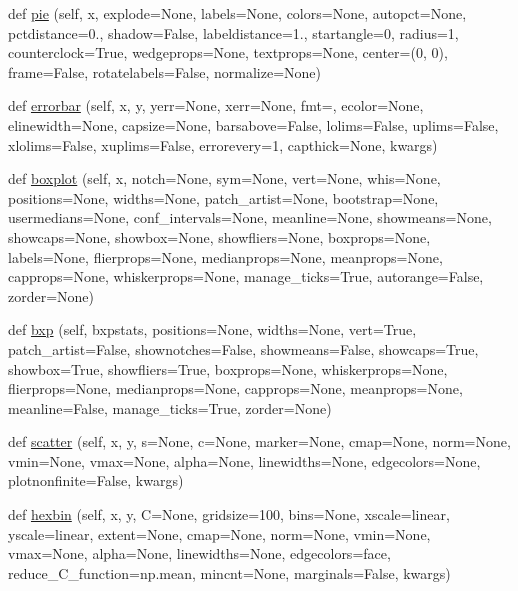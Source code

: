 \begin{DoxyCompactItemize}
\item 
def \hyperlink{classmatplotlib_1_1axes_1_1__axes_1_1Axes_ae60208a653a0074355baac9751f6a617}{pie} (self, x, explode=None, labels=None, colors=None, autopct=None, pctdistance=0., shadow=False, labeldistance=1., startangle=0, radius=1, counterclock=True, wedgeprops=None, textprops=None, center=(0, 0), frame=False, rotatelabels=False, normalize=None)
\item 
def \hyperlink{classmatplotlib_1_1axes_1_1__axes_1_1Axes_ae7929e06bf54360c0f18b8dfe1978dfa}{errorbar} (self, x, y, yerr=None, xerr=None, fmt=\textquotesingle{}\textquotesingle{}, ecolor=None, elinewidth=None, capsize=None, barsabove=False, lolims=False, uplims=False, xlolims=False, xuplims=False, errorevery=1, capthick=None, kwargs)
\item 
def \hyperlink{classmatplotlib_1_1axes_1_1__axes_1_1Axes_a46dcdf5ee6ffacd43006a294350c7ab9}{boxplot} (self, x, notch=None, sym=None, vert=None, whis=None, positions=None, widths=None, patch\+\_\+artist=None, bootstrap=None, usermedians=None, conf\+\_\+intervals=None, meanline=None, showmeans=None, showcaps=None, showbox=None, showfliers=None, boxprops=None, labels=None, flierprops=None, medianprops=None, meanprops=None, capprops=None, whiskerprops=None, manage\+\_\+ticks=True, autorange=False, zorder=None)
\item 
def \hyperlink{classmatplotlib_1_1axes_1_1__axes_1_1Axes_aa7e55966db2d7da950b46bbe69cc3849}{bxp} (self, bxpstats, positions=None, widths=None, vert=True, patch\+\_\+artist=False, shownotches=False, showmeans=False, showcaps=True, showbox=True, showfliers=True, boxprops=None, whiskerprops=None, flierprops=None, medianprops=None, capprops=None, meanprops=None, meanline=False, manage\+\_\+ticks=True, zorder=None)
\item 
def \hyperlink{classmatplotlib_1_1axes_1_1__axes_1_1Axes_a8cb331908d3ec822cecc7f7c975af6b6}{scatter} (self, x, y, s=None, c=None, marker=None, cmap=None, norm=None, vmin=None, vmax=None, alpha=None, linewidths=None, edgecolors=None, plotnonfinite=False, kwargs)
\item 
def \hyperlink{classmatplotlib_1_1axes_1_1__axes_1_1Axes_a145712d37f6f1989cc251cfc4358140e}{hexbin} (self, x, y, C=None, gridsize=100, bins=None, xscale=\textquotesingle{}linear\textquotesingle{}, yscale=\textquotesingle{}linear\textquotesingle{}, extent=None, cmap=None, norm=None, vmin=None, vmax=None, alpha=None, linewidths=None, edgecolors=\textquotesingle{}face\textquotesingle{}, reduce\+\_\+\+C\+\_\+function=np.\+mean, mincnt=None, marginals=False, kwargs)

\end{DoxyCompactItemize}
